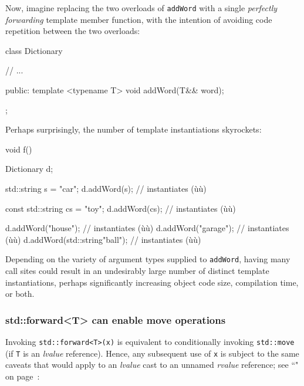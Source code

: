 \noindent Now, imagine replacing the two overloads of \texttt{addWord} with a
single \textit{perfectly forwarding} template member function, with the intention
of avoiding code repetition between the two overloads:

\begin{emcppslisting}[emcppsbatch=e16]
class Dictionary
{
    // ...

public:
    template <typename T>
    void addWord(T&& word);
};
\end{emcppslisting}

\noindent Perhaps surprisingly, the number of template instantiations skyrockets:

\begin{emcppslisting}[emcppsbatch=e16]
void f()
{
    Dictionary d;

    std::string s = "car";
    d.addWord(s);  // instantiates (ù{}ù)

    const std::string cs = "toy";
    d.addWord(cs);  // instantiates (ù{}ù)

    d.addWord("house");              // instantiates (ù{}ù)
    d.addWord("garage");             // instantiates (ù{}ù)
    d.addWord(std::string{"ball"});  // instantiates (ù{}ù)
}
\end{emcppslisting}

\noindent Depending on the variety of argument types supplied to \texttt{addWord},
having many call sites could result in an undesirably large number of
distinct template instantiations, perhaps significantly increasing
object code size, compilation time, or both.

\subsubsection[{\tt std::forward<T>} can enable move operations]{{\SubsubsecCode std::forward<T>} can enable move operations}\label{std::forward<t>-can-enable-move-operations}

Invoking \texttt{std::forward<T>(x)} is equivalent to conditionally
invoking \texttt{std::move} (if \texttt{T} is an
\emph{lvalue} reference). Hence, any subsequent use of \texttt{x} is
subject to the same caveats that would apply to an \emph{lvalue} cast to
an unnamed \emph{rvalue} reference; see ``" on page~\pageref{Rvalue-References}:

